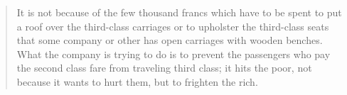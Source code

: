 \begin{quote}
It is not because of the few thousand francs which have to be spent to put a roof over the third-class carriages or to upholster the third-class seats that some company or other has open carriages with wooden benches. What the company is trying to do is to prevent the passengers who pay the second class fare from traveling third class; it hits the poor, not because it wants to hurt them, but to frighten the rich.
\end{quote}





